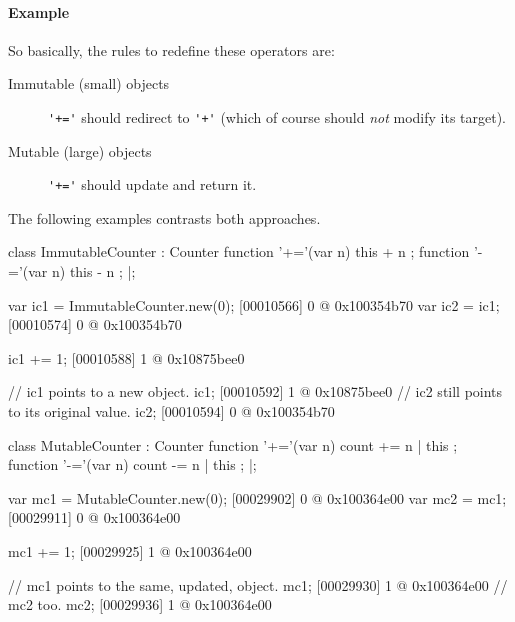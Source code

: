 \paragraph{Example}
So basically, the rules to redefine these operators are:
\begin{description}
\item[Immutable (small) objects] \lstinline|'+='| should redirect to
  \lstinline|'+'| (which of course should \emph{not} modify its target).
\item[Mutable (large) objects] \lstinline|'+='| should update \this and
  return it.
\end{description}

The following examples contrasts both approaches.

\begin{multicols}{2}
\begin{urbiscript}[xrightmargin=0mm,xleftmargin=0mm]
class ImmutableCounter : Counter
{
  function '+='(var n) { this + n };
  function '-='(var n) { this - n };
}|;

var ic1 = ImmutableCounter.new(0);
[00010566] 0 @ 0x100354b70
var ic2 = ic1;
[00010574] 0 @ 0x100354b70

ic1 += 1;
[00010588] 1 @ 0x10875bee0

// ic1 points to a new object.
ic1;
[00010592] 1 @ 0x10875bee0
// ic2 still points to its original value.
ic2;
[00010594] 0 @ 0x100354b70
\end{urbiscript}
\columnbreak
\begin{urbiscript}[xrightmargin=0mm,xleftmargin=0mm]
class MutableCounter : Counter
{
  function '+='(var n) { count += n | this };
  function '-='(var n) { count -= n | this };
}|;

var mc1 = MutableCounter.new(0);
[00029902] 0 @ 0x100364e00
var mc2 = mc1;
[00029911] 0 @ 0x100364e00

mc1 += 1;
[00029925] 1 @ 0x100364e00

// mc1 points to the same, updated, object.
mc1;
[00029930] 1 @ 0x100364e00
// mc2 too.
mc2;
[00029936] 1 @ 0x100364e00
\end{urbiscript}
\end{multicols}


